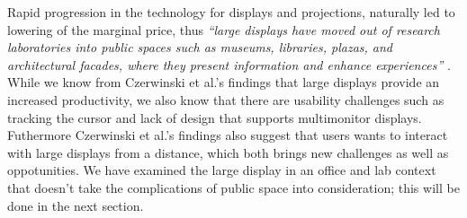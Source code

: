 Rapid progression in the technology for displays and projections, naturally led to lowering of the marginal price, thus \emph{``large displays have moved out of research laboratories into public spaces such as museums, libraries, plazas, and architectural facades, where they present information and enhance experiences''} \cite{Hinrichs:2013:IPD:2478559.2478965}.  %
While we know from Czerwinski et al.'s \cite{Czerwinski:2003} findings  that large displays provide an increased productivity, we also know that there are usability challenges such as tracking the cursor and lack of design that supports multimonitor displays. Futhermore Czerwinski et al.'s findings also suggest that users wants to interact with large displays from a distance, which both brings new challenges as well as oppotunities. We have examined the large display in an office and lab context that  doesn't take the complications of public space into consideration; this will be done in the next section.
